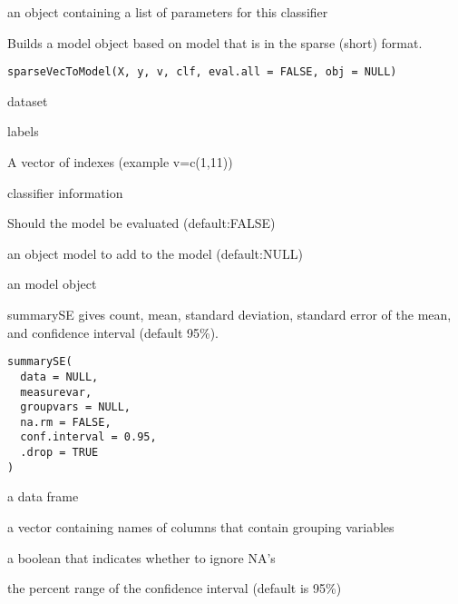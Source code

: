 \documentclass[a4paper]{book}
\begin{document}
%
\begin{Value}
an object containing a list of parameters for this classifier
\end{Value}
%
\begin{Description}
Builds a model object based on model that is in the sparse (short) format.
\end{Description}
%
\begin{Usage}
\begin{verbatim}
sparseVecToModel(X, y, v, clf, eval.all = FALSE, obj = NULL)
\end{verbatim}
\end{Usage}
%
\begin{Arguments}
\begin{ldescription}
\item[\code{X:}] dataset

\item[\code{y:}] labels

\item[\code{v:}] A vector of indexes (example v=c(1,11))

\item[\code{clf:}] classifier information

\item[\code{eval.all:}] Should the model be evaluated (default:FALSE)

\item[\code{obj:}] an object model to add to the model (default:NULL)
\end{ldescription}
\end{Arguments}
%
\begin{Value}
an model object
\end{Value}
%
\begin{Description}
summarySE gives count, mean, standard deviation, standard error of the mean, and confidence interval (default 95\%).
\end{Description}
%
\begin{Usage}
\begin{verbatim}
summarySE(
  data = NULL,
  measurevar,
  groupvars = NULL,
  na.rm = FALSE,
  conf.interval = 0.95,
  .drop = TRUE
)
\end{verbatim}
\end{Usage}
%
\begin{Arguments}
\begin{ldescription}
\item[\code{data:}] a data frame

\item[\code{groupvars:}] a vector containing names of columns that contain grouping variables

\item[\code{na.rm:}] a boolean that indicates whether to ignore NA's

\item[\code{conf.interval:}] the percent range of the confidence interval (default is 95\%)
\end{ldescription}
\end{Arguments}
\end{document}
